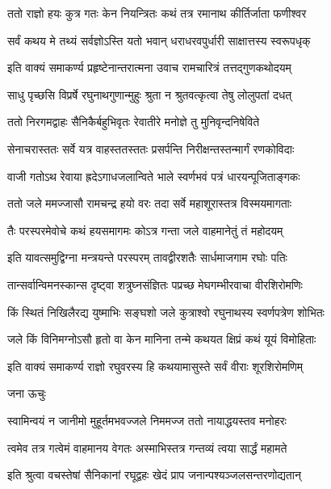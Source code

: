 \twolineshloka
{ततो राज्ञो हयः कुत्र गतः केन नियन्त्रितः}
{कथं तत्र रमानाथ कीर्तिर्जाता फणीश्वर}%

\twolineshloka
{सर्वं कथय मे तथ्यं सर्वज्ञोऽस्ति यतो भवान्}
{धराधरवपुर्धारी साक्षात्तस्य स्वरूपधृक्}%


\twolineshloka
{इति वाक्यं समाकर्ण्य प्रहृष्टेनान्तरात्मना}
{उवाच रामचारित्रं तत्तद्गुणकथोदयम्}%


\twolineshloka
{साधु पृच्छसि विप्रर्षे रघुनाथगुणान्मुहुः}
{श्रुता न श्रुतवत्कृत्वा तेषु लोलुपतां दधत्}%

\twolineshloka
{ततो निरगमद्वाहः सैनिकैर्बहुभिवृतः}
{रेवातीरे मनोज्ञे तु मुनिवृन्दनिषेविते}%

\twolineshloka
{सेनाचरास्ततः सर्वे यत्र वाहस्ततस्ततः}
{प्रसर्पन्ति निरीक्षन्तस्तन्मार्गं रणकोविदाः}%

\twolineshloka
{वाजी गतोऽथ रेवाया ह्रदेऽगाधजलान्विते}
{भाले स्वर्णभवं पत्रं धारयन्पूजिताङ्गकः}%

\twolineshloka
{ततो जले ममज्जासौ रामचन्द्र हयो वरः}
{तदा सर्वे महाशूरास्तत्र विस्मयमागताः}%

\twolineshloka
{तैः परस्परमेवोचे कथं हयसमागमः}
{कोऽत्र गन्ता जले वाहमानेतुं तं महोदयम्}%

\twolineshloka
{इति यावत्समुद्विग्ना मन्त्रयन्ते परस्परम्}
{तावद्वीरशतैः सार्धमाजगाम रघोः पतिः}%

\twolineshloka
{तान्सर्वान्विमनस्कान्स दृष्ट्वा शत्रुघ्नसंज्ञितः}
{पप्रच्छ मेघगम्भीरवाचा वीरशिरोमणिः}%

\twolineshloka
{किं स्थितं निखिलैरद्य युष्माभिः सङ्घशो जले}
{कुत्राश्वो रघुनाथस्य स्वर्णपत्रेण शोभितः}%

\twolineshloka
{जले किं विनिमग्नोऽसौ हृतो वा केन मानिना}
{तन्मे कथयत क्षिप्रं कथं यूयं विमोहिताः}%


\twolineshloka
{इति वाक्यं समाकर्ण्य राज्ञो रघुवरस्य हि}
{कथयामासुस्ते सर्वं वीराः शूरशिरोमणिम्}%

जना ऊचुः

\twolineshloka
{स्वामिन्वयं न जानीमो मुहूर्तमभवज्जले}
{निममज्ज ततो नायाद्धयस्तव मनोहरः}%

\twolineshloka
{त्वमेव तत्र गत्वेमं वाहमानय वेगतः}
{अस्माभिस्तत्र गन्तव्यं त्वया सार्द्धं महामते}%

\twolineshloka
{इति श्रुत्वा वचस्तेषां सैनिकानां रघूद्वहः}
{खेदं प्राप जनान्पश्यञ्जलसन्तरणोद्यतान्}%


